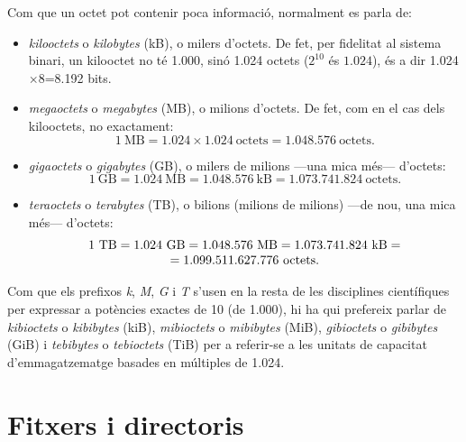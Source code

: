 Com que un octet pot contenir poca informació, normalment es parla de:
\begin{itemize}
\item \emph{kilooctets} o \emph{kilobytes} (kB), o milers d'octets.
  De fet, per fidelitat al sistema binari, un kilooctet no té 1.000,
  sinó 1.024 octets ($2^{10}$ és $1.024$), és a dir
  1.024$\times$8=8.192 bits.
\item \emph{megaoctets} o \emph{megabytes} (MB), o milions d'octets.
  De fet, com en el cas dels kilooctets, no exactament:
  $$1~\mbox{MB} = 1.024 \times 1.024~\mbox{octets}= 1.048.576~\mbox{octets}.$$
\item \emph{gigaoctets} o \emph{gigabytes} (GB), o milers de milions
  ---una mica més--- d'octets:
  $$1~\mbox{GB}=1.024~\mbox{MB}=1.048.576~\mbox{kB}=1.073.741.824~\mbox{octets}.$$
\item \emph{teraoctets} o \emph{terabytes} (TB), o bilions (milions de
  milions) ---de nou, una mica més--- d'octets:
  \[
  \begin{array}{c}
    $$1~\mbox{TB}=1.024~\mbox{GB}=1.048.576~\mbox{MB}=1.073.741.824~\mbox{kB}=\\
    =1.099.511.627.776~\mbox{octets}.$$
  \end{array}
  \]
\end{itemize}
Com que els prefixos \emph{k}, \emph{M}, \emph{G} i \emph{T} s'usen en
la resta de les disciplines científiques per expressar a potències
exactes de 10 (de 1.000), hi ha qui prefereix parlar de
\emph{kibioctets} o \emph{kibibytes} (kiB), \emph{mibioctets} o
\emph{mibibytes} (MiB), \emph{gibioctets} o \emph{gibibytes} (GiB) i
\emph{tebibytes} o \emph{tebioctets} (TiB) per a referir-se a les
unitats de capacitat d'emmagatzematge basades en múltiples de 1.024.




\section{Fitxers i directoris}
\label{se:fitxers}
\label{pg:fitxer}

